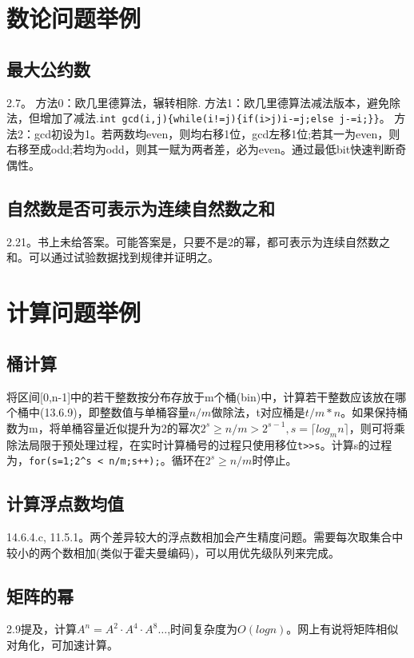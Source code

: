 \section{数论问题举例}

\subsection{最大公约数}
\cite{bop}2.7。\label{subsec:gcd}
方法0：欧几里德算法，辗转相除.
方法1：欧几里德算法减法版本，避免除法，但增加了减法.\verb|int gcd(i,j){while(i!=j){if(i>j)i-=j;else j-=i;}}|。
方法2：gcd初设为1。若两数均even，则均右移1位，gcd左移1位;若其一为even，则右移至成odd;若均为odd，则其一赋为两者差，必为even。通过最低bit快速判断奇偶性。


\subsection{自然数是否可表示为连续自然数之和}
\cite{bop}2.21。书上未给答案。可能答案是，只要不是2的幂，都可表示为连续自然数之和。可以通过试验数据找到规律并证明之。

\section{计算问题举例}

\subsection{桶计算}
将区间[0,n-1]中的若干整数按分布存放于m个桶(bin)中，计算若干整数应该放在哪个桶中(\cite{pp}13.6.9)，即整数值与单桶容量$n/m$做除法，t对应桶是$t/m*n$。如果保持桶数为m，将单桶容量近似提升为2的幂次$2^s \ge n/m > 2^{s-1},s=\lceil log_{m}{n} \rceil$，则可将乘除法局限于预处理过程，在实时计算桶号的过程只使用移位\verb|t>>s|。计算s的过程为，\verb|for(s=1;2^s < n/m;s++);|。循环在$2^s \ge n/m$时停止。

\subsection{计算浮点数均值}
\cite{pp}14.6.4.c, 11.5.1。两个差异较大的浮点数相加会产生精度问题。需要每次取集合中较小的两个数相加(类似于霍夫曼编码)，可以用优先级队列来完成。

\subsection{矩阵的幂}
\cite{bop}2.9提及，计算$A^n=A^{2} \cdot A^{4} \cdot A^{8}\dots$,时间复杂度为$O(logn)$。网上有说将矩阵相似对角化，可加速计算。
\label{matrixexpo}
